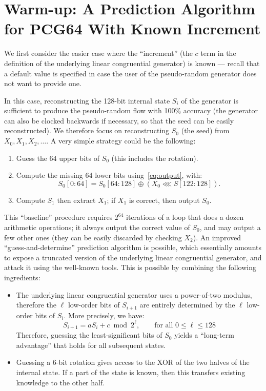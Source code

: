 \documentclass[submission,svgnames,journal=tosc]{iacrtrans}
\begin{document}
\section{Warm-up: A Prediction Algorithm for \textsf{PCG64} With Known Increment}
\label{sec:Cknown}

We first consider the easier case where the ``increment'' (the $c$ term in the
definition of the underlying linear congruential generator) is known --- recall
that a default value is specified in case the user of the pseudo-random
generator does not want to provide one.

In this case, reconstructing the 128-bit internal state $S_i$ of the generator
is sufficient to produce the pseudo-random flow with 100\% accuracy (the
generator can also be clocked backwards if necessary, so that the seed can be
easily reconstructed). We therefore focus on reconstructing $S_0$ (the seed)
from $X_0, X_1, X_2, \dots$. A very simple strategy could be the following:
\begin{enumerate}
\item Guess the 64 upper bits of $S_0$ (this includes the rotation).
\item Compute the missing 64 lower bits using~\eqref{eq:output}, with:
\[
   S_0[0:64] = S_0[64:128] \oplus (X_0  \lll S[122:128]).
\]
\item Compute $S_1$ then extract $X_1$; if $X_1$ is correct, then output $S_0$.
\end{enumerate}

This ``baseline'' procedure requires $2^{64}$ iterations of a loop that does a
dozen arithmetic operations; it always output the correct value of $S_0$, and
may output a few other ones (they can be easily discarded by checking $X_2$). An
improved ``guess-and-determine'' prediction algorithm is possible, which
essentially amounts to expose a truncated version of the underlying linear
congruential generator, and attack it using the well-known tools. This is
possible by combining the following ingredients:
\begin{itemize}
\item The underlying linear congruential generator uses a power-of-two modulus,
  therefore the $\ell$ low-order bits of $S_{i+1}$ are entirely determined by
  the $\ell$ low-order bits of $S_i$. More precisely, we have:
  \begin{equation}\label{eq:lcg}
    S_{i+1} = aS_i + c \bmod 2^\ell, \qquad \text{for all } 0 \leq \ell \leq 128
  \end{equation}
  Therefore, guessing the least-significant bits of $S_0$ yields a ``long-term
  advantage'' that holds for all subsequent states.

\item Guessing a 6-bit rotation gives access to the XOR of the two halves of the
  internal state. If a part of the state is known, then this transfers existing
  knowledge to the other half.
\end{itemize}
\end{document}

